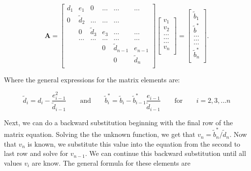 \documentclass[%
oneside,                 %
final,                   %
10pt]{article}
\begin{document}
\[
    \mathbf{A} = \begin{bmatrix}
                           d_1& e_1 & 0 &\dots   & \dots &\dots \\
                           0 & \tilde{d}_2 &\dots &\dots &\dots \\
                           & 0 & \tilde{d}_3 & e_3 & \dots & \dots \\
                           & \dots   & \dots &\dots   &\dots & \dots \\
                           &   &  & 0  &\tilde{d}_{n-1}& e_{n-1} \\
                           &    &  &   &0 & \tilde{d}_n \\
                      \end{bmatrix}\begin{bmatrix}
                           v_1\\
                           v_2\\
                           \dots \\
                          \dots  \\
                          \dots \\
                           v_n\\
                      \end{bmatrix}
  =\begin{bmatrix}
                           \tilde{b}_1\\
                           \tilde{b}^*\\
                           \dots \\
                           \dots \\
                          \dots \\
                           \tilde{b}^*_n\\
                      \end{bmatrix}.
\]

Where the general expressions for the matrix elements are:


\begin{equation} \label{eqn:General12}
\tilde{d}_i = d_i - \frac{e^2_{i-1}}{\tilde{d}_{i-1}}
\qquad \text{and} \qquad
\tilde{b}^*_i = \tilde{b}_i - \tilde{b}_{i-1}^* \frac{e_{i-1}}{\tilde{d}_{i-1}} 
\qquad \text{for} \qquad i=2,3,...n
\end{equation}



Next, we can do a backward substitution beginning with the final row of the matrix equation.  Solving the the unknown function, we get that $v_n=\tilde{b}^*_n/\tilde{d}_n$.  Now that $v_n$ is known, we substitute this value into the equation from the second to last row and solve for $v_{n-1}$.  We can continue this backward substitution until all values $v_i$ are know.  The general formula for these elements are
\end{document}
